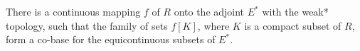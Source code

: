 There is a continuous mapping $f$ of $R$ onto the adjoint $E^*$ with the weak* topology, such that the family of sets $f[K]$, where $K$ is a compact subset of $R$, form a co-base for the equicontinuous subsets of $E^*$.
